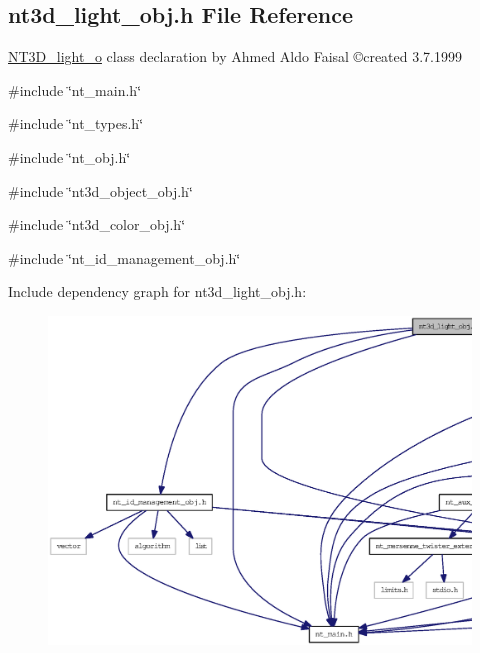 \subsection{nt3d\_\-light\_\-obj.h File Reference}
\label{nt3d__light__obj_8h}



\begin{DoxyItemize}
\item \hyperlink{class_n_t3_d__light__o}{NT3D\_\-light\_\-o} class declaration by Ahmed Aldo Faisal \copyright created 3.7.1999 
\end{DoxyItemize} 


{\ttfamily \#include \char`\"{}nt\_\-main.h\char`\"{}}\par
{\ttfamily \#include \char`\"{}nt\_\-types.h\char`\"{}}\par
{\ttfamily \#include \char`\"{}nt\_\-obj.h\char`\"{}}\par
{\ttfamily \#include \char`\"{}nt3d\_\-object\_\-obj.h\char`\"{}}\par
{\ttfamily \#include \char`\"{}nt3d\_\-color\_\-obj.h\char`\"{}}\par
{\ttfamily \#include \char`\"{}nt\_\-id\_\-management\_\-obj.h\char`\"{}}\par
Include dependency graph for nt3d\_\-light\_\-obj.h:
\nopagebreak
\begin{figure}[H]
\begin{center}
\leavevmode
\includegraphics[width=400pt]{nt3d__light__obj_8h__incl}
\end{center}
\end{figure}
